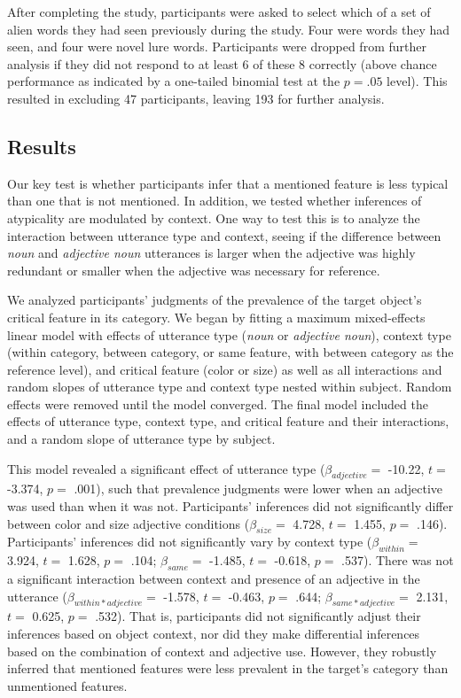 \documentclass{ucetd}
\begin{document}
After completing the study, participants were asked to select which of a
set of alien words they had seen previously during the study. Four were
words they had seen, and four were novel lure words. Participants were
dropped from further analysis if they did not respond to at least 6 of
these 8 correctly (above chance performance as indicated by a one-tailed
binomial test at the \(p = .05\) level). This resulted in excluding 47
participants, leaving 193 for further analysis.

\hypertarget{results-2}{%
\subsection{Results}\label{results-2}}

Our key test is whether participants infer that a mentioned feature is
less typical than one that is not mentioned. In addition, we tested
whether inferences of atypicality are modulated by context. One way to
test this is to analyze the interaction between utterance type and
context, seeing if the difference between \emph{noun} and
\emph{adjective noun} utterances is larger when the adjective was highly
redundant or smaller when the adjective was necessary for reference.

We analyzed participants' judgments of the prevalence of the target
object's critical feature in its category. We began by fitting a maximum
mixed-effects linear model with effects of utterance type (\emph{noun}
or \emph{adjective noun}), context type (within category, between
category, or same feature, with between category as the reference
level), and critical feature (color or size) as well as all interactions
and random slopes of utterance type and context type nested within
subject. Random effects were removed until the model converged. The
final model included the effects of utterance type, context type, and
critical feature and their interactions, and a random slope of utterance
type by subject.

This model revealed a significant effect of utterance type
(\(\beta_{adjective} =\) -10.22, \(t =\) -3.374, \(p =\) .001), such
that prevalence judgments were lower when an adjective was used than
when it was not. Participants' inferences did not significantly differ
between color and size adjective conditions (\(\beta_{size} =\) 4.728,
\(t =\) 1.455, \(p =\) .146). Participants' inferences did not
significantly vary by context type (\(\beta_{within} =\) 3.924, \(t =\)
1.628, \(p =\) .104; \(\beta_{same} =\) -1.485, \(t =\) -0.618, \(p =\)
.537). There was not a significant interaction between context and
presence of an adjective in the utterance
(\(\beta_{within*adjective} =\) -1.578, \(t =\) -0.463, \(p =\) .644;
\(\beta_{same*adjective} =\) 2.131, \(t =\) 0.625, \(p =\) .532). That
is, participants did not significantly adjust their inferences based on
object context, nor did they make differential inferences based on the
combination of context and adjective use. However, they robustly
inferred that mentioned features were less prevalent in the target's
category than unmentioned features.
\end{document}
